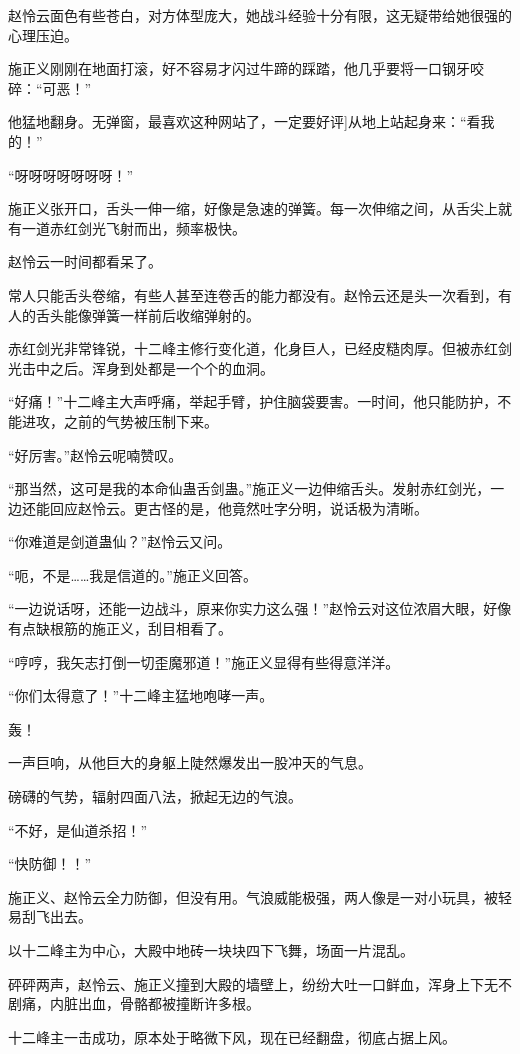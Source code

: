 \begin{this_body}
赵怜云面色有些苍白，对方体型庞大，她战斗经验十分有限，这无疑带给她很强的心理压迫。

施正义刚刚在地面打滚，好不容易才闪过牛蹄的踩踏，他几乎要将一口钢牙咬碎：“可恶！”

他猛地翻身。无弹窗，最喜欢这种网站了，一定要好评]从地上站起身来：“看我的！”

“呀呀呀呀呀呀呀！”

施正义张开口，舌头一伸一缩，好像是急速的弹簧。每一次伸缩之间，从舌尖上就有一道赤红剑光飞射而出，频率极快。

赵怜云一时间都看呆了。

常人只能舌头卷缩，有些人甚至连卷舌的能力都没有。赵怜云还是头一次看到，有人的舌头能像弹簧一样前后收缩弹射的。

赤红剑光非常锋锐，十二峰主修行变化道，化身巨人，已经皮糙肉厚。但被赤红剑光击中之后。浑身到处都是一个个的血洞。

“好痛！”十二峰主大声呼痛，举起手臂，护住脑袋要害。一时间，他只能防护，不能进攻，之前的气势被压制下来。

“好厉害。”赵怜云呢喃赞叹。

“那当然，这可是我的本命仙蛊舌剑蛊。”施正义一边伸缩舌头。发射赤红剑光，一边还能回应赵怜云。更古怪的是，他竟然吐字分明，说话极为清晰。

“你难道是剑道蛊仙？”赵怜云又问。

“呃，不是……我是信道的。”施正义回答。

“一边说话呀，还能一边战斗，原来你实力这么强！”赵怜云对这位浓眉大眼，好像有点缺根筋的施正义，刮目相看了。

“哼哼，我矢志打倒一切歪魔邪道！”施正义显得有些得意洋洋。

“你们太得意了！”十二峰主猛地咆哮一声。

轰！

一声巨响，从他巨大的身躯上陡然爆发出一股冲天的气息。

磅礴的气势，辐射四面八法，掀起无边的气浪。

“不好，是仙道杀招！”

“快防御！！”

施正义、赵怜云全力防御，但没有用。气浪威能极强，两人像是一对小玩具，被轻易刮飞出去。

以十二峰主为中心，大殿中地砖一块块四下飞舞，场面一片混乱。

砰砰两声，赵怜云、施正义撞到大殿的墙壁上，纷纷大吐一口鲜血，浑身上下无不剧痛，内脏出血，骨骼都被撞断许多根。

十二峰主一击成功，原本处于略微下风，现在已经翻盘，彻底占据上风。


\end{this_body}
